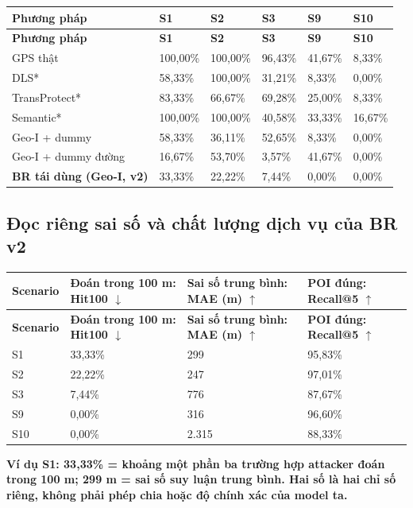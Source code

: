 \documentclass[10pt,a4paper]{article}
\newcommand{\key}[1]{\par\smallskip\noindent\colorbox{pale}{\parbox{\dimexpr\linewidth-2\fboxsep}{\textbf{#1}}}\par\smallskip}
\begin{document}
\begingroup\small
\begin{longtable}{@{}P{3.364cm}P{2.486cm}P{2.486cm}P{2.486cm}P{2.486cm}P{2.486cm}@{}}
\toprule
\textbf{Phương pháp} & \textbf{S1} & \textbf{S2} & \textbf{S3} & \textbf{S9} & \textbf{S10}\\\midrule
\endfirsthead
\toprule
\textbf{Phương pháp} & \textbf{S1} & \textbf{S2} & \textbf{S3} & \textbf{S9} & \textbf{S10}\\\midrule
\endhead
\bottomrule\endfoot
GPS thật & 100,00\% & 100,00\% & 96,43\% & 41,67\% & 8,33\%\\
\addlinespace[3pt]
DLS* & 58,33\% & 100,00\% & 31,21\% & 8,33\% & 0,00\%\\
\addlinespace[3pt]
TransProtect* & 83,33\% & 66,67\% & 69,28\% & 25,00\% & 8,33\%\\
\addlinespace[3pt]
Semantic* & 100,00\% & 100,00\% & 40,58\% & 33,33\% & 16,67\%\\
\addlinespace[3pt]
Geo-I + dummy & 58,33\% & 36,11\% & 52,65\% & 8,33\% & 0,00\%\\
\addlinespace[3pt]
Geo-I + dummy đường & 16,67\% & 53,70\% & 3,57\% & 41,67\% & 0,00\%\\
\addlinespace[3pt]
\textbf{BR tái dùng (Geo-I, v2)} & 33,33\% & 22,22\% & 7,44\% & 0,00\% & 0,00\%\\
\end{longtable}
\endgroup
\subsection{Đọc riêng sai số và chất lượng dịch vụ của BR v2}\label{sub:3.2}
\begingroup\small
\begin{longtable}{@{}P{1.936cm}P{4.646cm}P{4.936cm}P{4.839cm}@{}}
\toprule
\textbf{Scenario} & \textbf{Đoán trong 100 m: Hit100 $\downarrow$} & \textbf{Sai số trung bình: MAE (m) $\uparrow$} & \textbf{POI đúng: Recall@5 $\uparrow$}\\\midrule
\endfirsthead
\toprule
\textbf{Scenario} & \textbf{Đoán trong 100 m: Hit100 $\downarrow$} & \textbf{Sai số trung bình: MAE (m) $\uparrow$} & \textbf{POI đúng: Recall@5 $\uparrow$}\\\midrule
\endhead
\bottomrule\endfoot
S1 & 33,33\% & 299 & 95,83\%\\
\addlinespace[3pt]
S2 & 22,22\% & 247 & 97,01\%\\
\addlinespace[3pt]
S3 & 7,44\% & 776 & 87,67\%\\
\addlinespace[3pt]
S9 & 0,00\% & 316 & 96,60\%\\
\addlinespace[3pt]
S10 & 0,00\% & 2.315 & 88,33\%\\
\end{longtable}
\endgroup
\key{Ví dụ S1: 33,33\% = khoảng một phần ba trường hợp attacker đoán trong 100 m; 299 m = sai số suy luận trung bình. Hai số là hai chỉ số riêng, không phải phép chia hoặc độ chính xác của model ta.}
\end{document}
